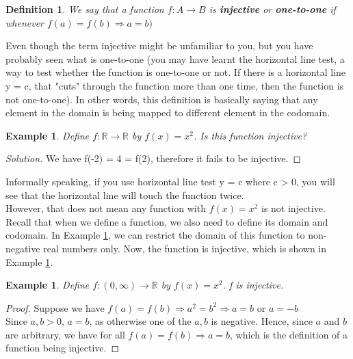 \documentclass{book}
\newtheorem{definition}[theorem]{Definition}
\newtheorem{example}[theorem]{Example}
\begin{document}
\begin{definition}
    We say that a function $f : A \rightarrow B$ is \textbf{injective} or \textbf{one-to-one} if whenever $f(a) = f(b) \Rightarrow a = b)$
\end{definition}

Even though the term injective might be unfamiliar to you, but you have probably seen what is one-to-one (you may have learnt the horizontal line test, a way to test whether the function is one-to-one or not. If there is a horizontal line 
 y = c, that "cuts" through the function more than one time, then the function is not one-to-one). In other words, this definition is basically saying that any element in the domain is being mapped to different element in the codomain.

\begin{example} \label{Example 1.2.2}
    Define $f : \mathbb{R} \rightarrow \mathbb{R}$ by $f(x) = x^{2}$. Is this function injective?
\end{example}
\begin{proof}[Solution]
    We have f(-2) = 4 = f(2), therefore it fails to be injective.
\end{proof}

Informally speaking, if you use horizontal line test y = c where c > 0, you will see that the horizontal line will touch the function twice. \\
\indent However, that does not mean any function with $f(x) = x^{2}$ is not injective. Recall that when we define a function, we also need to define its domain and codomain. In Example \ref{Example 1.2.2}, we can restrict the domain of this function to non-negative real numbers only. Now, the function is injective, which is shown in Example \ref{Example 1.2.3}.

\begin{example} \label{Example 1.2.3}
    Define $f : (0, \infty) \rightarrow \mathbb{R}$ by $f(x) = x^{2}$. f is injective.
\end{example}
\begin{proof}
Suppose we have $f(a) = f(b) \Rightarrow a^{2} = b^{2} \Rightarrow a = b$ or $a = -b$ \\
Since $a, b > 0$, $a = b$, as otherwise one of the $a, b$ is negative. Hence, since $a$ and $b$ are arbitrary, we have for all $f(a) = f(b) \Rightarrow a = b$, which is the definition of a function being injective.
\end{proof}
\end{document}
